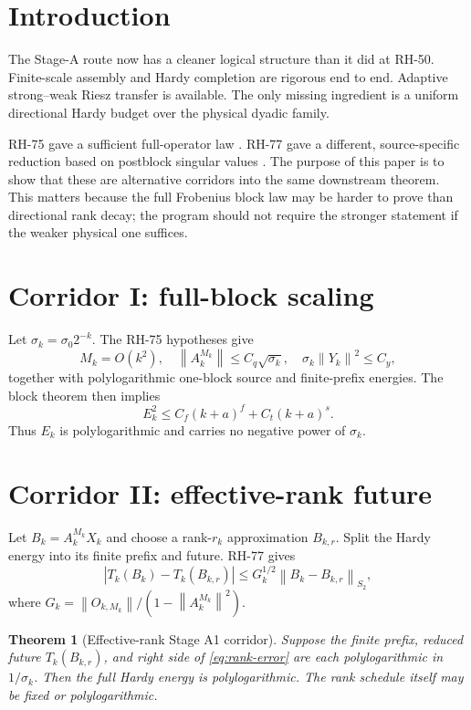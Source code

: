 \documentclass[11pt]{article}
\newtheorem{theorem}{Theorem}[section]
\newcommand{\norm}[1]{\left\lVert#1\right\rVert}
\begin{document}
\section{Introduction}

The Stage-A route now has a cleaner logical structure than it did at RH-50.
Finite-scale assembly and Hardy completion are rigorous end to end.  Adaptive
strong--weak Riesz transfer is available.  The only missing ingredient is a
uniform directional Hardy budget over the physical dyadic family.

RH-75 gave a sufficient full-operator law \citep{WangScaling2026}.  RH-77 gave
a different, source-specific reduction based on postblock singular values
\citep{WangRank2026}.  The purpose of this paper is to show that these are
alternative corridors into the same downstream theorem.  This matters
because the full Frobenius block law may be harder to prove than directional
rank decay; the program should not require the stronger statement if the
weaker physical one suffices.

\section{Corridor I: full-block scaling}

Let $\sigma_k=\sigma_0 2^{-k}$.  The RH-75 hypotheses give
\[
 M_k=O(k^2),\quad
 \norm{A_k^{M_k}}\le C_q\sqrt{\sigma_k},\quad
 \sigma_k\norm{Y_k}^2\le C_y,
\]
together with polylogarithmic one-block source and finite-prefix energies.
The block theorem then implies
\begin{equation}
 E_k^2\le C_f(k+a)^f+C_t(k+a)^s.
 \label{eq:block-corridor}
\end{equation}
Thus $E_k$ is polylogarithmic and carries no negative power of $\sigma_k$.

\section{Corridor II: effective-rank future}

Let $B_k=A_k^{M_k}X_k$ and choose a rank-$r_k$ approximation
$B_{k,r}$.  Split the Hardy energy into its finite prefix and future.  RH-77
gives
\begin{equation}
 |T_k(B_k)-T_k(B_{k,r})|
 \le G_k^{1/2}\norm{B_k-B_{k,r}}_{S_2},
 \label{eq:rank-error}
\end{equation}
where
$G_k=\norm{O_{k,M_k}}/(1-\norm{A_k^{M_k}}^2)$.

\begin{theorem}[Effective-rank Stage A1 corridor]
\label{thm:rank-corridor}
Suppose the finite prefix, reduced future $T_k(B_{k,r})$, and right side of
\eqref{eq:rank-error} are each polylogarithmic in $1/\sigma_k$.  Then the full
Hardy energy is polylogarithmic.  The rank schedule itself may be fixed or
polylogarithmic.
\end{theorem}
\end{document}
